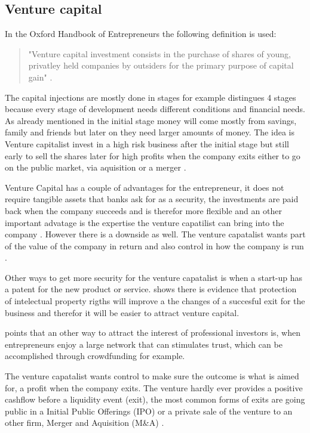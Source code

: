 \documentclass[a4paper, 11pt]{article}
\begin{document}
\subsection{Venture capital}

In the Oxford Handbook of Entrepreneurs the following definition is used:

\begin{quote}
"Venture capital investment consists in the purchase of shares of young, privatley held companies by outsiders for the primary purpose of capital gain" \citep[P.355]{casson2008oxford}.
\end{quote} 

The capital injections are mostly done in stages \cite{TiddBessant} for example distingues 4 stages because every stage of development needs different conditions and financial needs. As already mentioned in the initial stage money will come mostly from savings, family and friends but later on they need larger amounts of money. The idea is Venture capitalist invest in a high risk business after the initial stage but still early to sell the shares later for high profits when the company exits either to go on the public market, via aquisition or a merger \citep{TiddBessant}.

Venture Capital has a couple of advantages for the entrepreneur, it does not require tangible assets that banks ask for as a security, the investments are paid back when the company succeeds and is therefor more flexible and an other important advatage is the expertise the venture capatilist can bring into the company \citep{casson2008oxford}. However there is a downside as well. The venture capatalist wants part of the value of the company in return and also control in how the company is run \citep{casson2008oxford}.

Other ways to get more security for the venture capatalist is when a start-up has a patent for the new product or service.
\cite{nadeau2011innovation} shows there is evidence that protection of intelectual property rigths will improve a the changes of a succesful exit for the business and therefor it will be easier to attract venture capital.

 \cite{Roma} points that an other way to attract the interest of professional investors is, when entrepreneurs enjoy a large network that can stimulates trust, which can be accomplished through crowdfunding for example.


The venture capatalist wants control to make sure the outcome is what is aimed for, a profit when the company exits. The venture hardly ever provides a positive cashflow before a liquidity event (exit), the most common forms of exits are going public in a Initial Public Offerings (IPO) or a private sale of the venture to an other firm, Merger and Aquisition (M\&A) \citep{nadeau2011innovation}.
\end{document}
